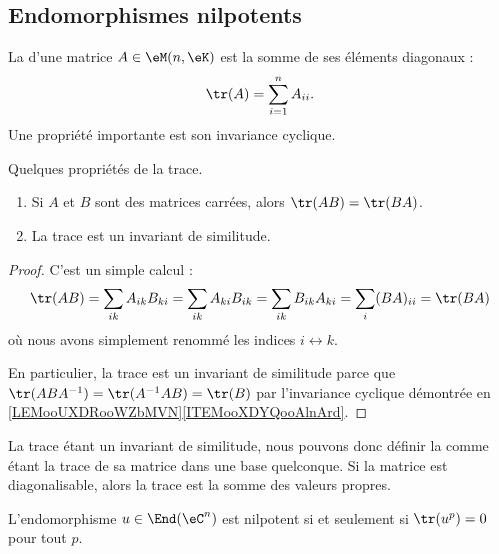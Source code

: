 \subsection{Endomorphismes nilpotents}

La  d'une matrice \( A\in \eM(n,\eK)\) est la somme de ses éléments diagonaux :
\begin{equation}
    \tr(A)=\sum_{i=1}^nA_{ii}.
\end{equation}
Une propriété importante est son invariance cyclique.

\begin{lemma}   \label{LemhbZTay}
    Quelques propriétés de la trace.
    \begin{enumerate}
        \item
    Si \( A\) et \( B\) sont des matrices carrées, alors \( \tr(AB)=\tr(BA)\).
\item
    La trace est un invariant de similitude.
    \end{enumerate}
\end{lemma}

\begin{proof}
    C'est un simple calcul :
    \begin{equation}
            \tr(AB)=\sum_{ik}A_{ik}B_{ki}
            =\sum_{ik}A_{ki}B_{ik}
            =\sum_{ik}B_{ik}A_{ki}
            =\sum_i(BA)_{ii}
            =\tr(BA)
    \end{equation}
    où nous avons simplement renommé les indices \( i\leftrightarrow k\).

    En particulier, la trace est un invariant de similitude parce que \( \tr(ABA^{-1})=\tr(A^{-1} AB)=\tr(B)\) par l'invariance cyclique démontrée en \ref{LEMooUXDRooWZbMVN}\ref{ITEMooXDYQooAlnArd}.
\end{proof}
La trace étant un invariant de similitude, nous pouvons donc définir la  comme étant la trace de sa matrice dans une base quelconque. Si la matrice est diagonalisable, alors la trace est la somme des valeurs propres.

\begin{lemma}   \label{LemzgNOjY}
    L'endomorphisme \( u\in\End(\eC^n)\) est nilpotent si et seulement si \( \tr(u^p)=0\) pour tout \( p\).
\end{lemma}

